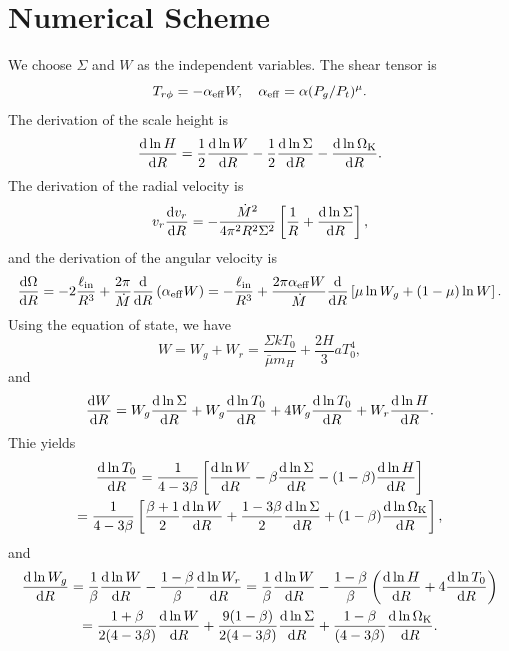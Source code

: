\documentclass[oneside]{book}
\def\rd{{\rm d}}
\begin{document}
\section{Numerical Scheme}
We choose $\Sigma$ and $W$ as the independent variables. The shear tensor is
\begin{equation}
T_{r\phi}=-\alpha_{\rm eff}W, ~~~\alpha_{\rm eff}=\alpha(P_g/P_t)^\mu.
\end{equation}
The derivation of the scale height is 
\begin{equation}
\frac{\rd\ln H}{\rd R}=\frac{1}{2}\frac{\rd\ln W}{\rd R}-\frac{1}{2}\frac{\rd\ln\Sigma}{\rd R}
-\frac{\rd\ln\Omega_{\rm K}}{\rd R}.
\end{equation}
The derivation of the radial velocity is
\begin{equation}
v_r\frac{\rd v_r}{\rd R}=-\frac{\dot M^2}{4\pi^2 R^2\Sigma^2}\left[\frac{1}{R}+\frac{\rd\ln\Sigma}{\rd R}\right],
\end{equation}
and the derivation of the angular velocity is 
\begin{equation}
\frac{\rd\Omega}{\rd R}=-2\frac{\ell_{\rm in}}{R^3}+\frac{2\pi}{\dot M}\frac{\rd}{\rd R}\left(\alpha_{\rm eff} W\right)
=-\frac{\ell_{\rm in}}{R^3}+\frac{2\pi\alpha_{\rm eff} W}{\dot M}\frac{\rd}{\rd R}\left[\mu\ln W_g +(1-\mu)\ln W\right].
\end{equation}
Using the equation of state, we have 
\begin{equation}
W=W_g+W_r=\frac{\Sigma k T_0}{\bar\mu m_H} + \frac{2H}{3}aT_0^4,
\end{equation}
and
\begin{equation}
\frac{\rd W}{\rd R}=W_g\frac{\rd \ln\Sigma}{\rd R} + W_g\frac{\rd\ln T_0}{\rd R}
+4W_g\frac{\rd\ln T_0}{\rd R} + W_r\frac{\rd \ln H}{\rd R}.
\end{equation}
Thie yields
\begin{gather}
\frac{\rd\ln T_0}{\rd R}=\frac{1}{4-3\beta}\left[\frac{\rd\ln W}{\rd R}
-\beta\frac{\rd\ln\Sigma}{\rd R} - (1-\beta)\frac{\rd \ln H}{\rd R}\right]\\
=\frac{1}{4-3\beta}\left[\frac{\beta +1}{2}\frac{\rd\ln W}{\rd R}
+\frac{1-3\beta}{2}\frac{\rd\ln\Sigma}{\rd R}+ (1-\beta)\frac{\rd \ln \Omega_{\rm K}}{\rd R}\right],
\end{gather}
and 
\begin{gather}
\frac{\rd \ln W_g}{\rd R}=\frac{1}{\beta}\frac{\rd\ln W}{\rd R} - \frac{1-\beta}{\beta}\frac{\rd\ln W_r}{\rd R}
=\frac{1}{\beta}\frac{\rd\ln W}{\rd R} - \frac{1-\beta}{\beta}\left(\frac{\rd\ln H}{\rd R}+4\frac{\rd\ln T_0}{\rd R}\right)\\
=\frac{1+\beta}{2(4-3\beta)}\frac{\rd\ln W}{\rd R}
+\frac{9(1-\beta)}{2(4-3\beta)}\frac{\rd\ln \Sigma}{\rd R}
+\frac{1-\beta}{(4-3\beta)}\frac{\rd\ln \Omega_{\rm K}}{\rd R}.
\end{gather}
\end{document}
